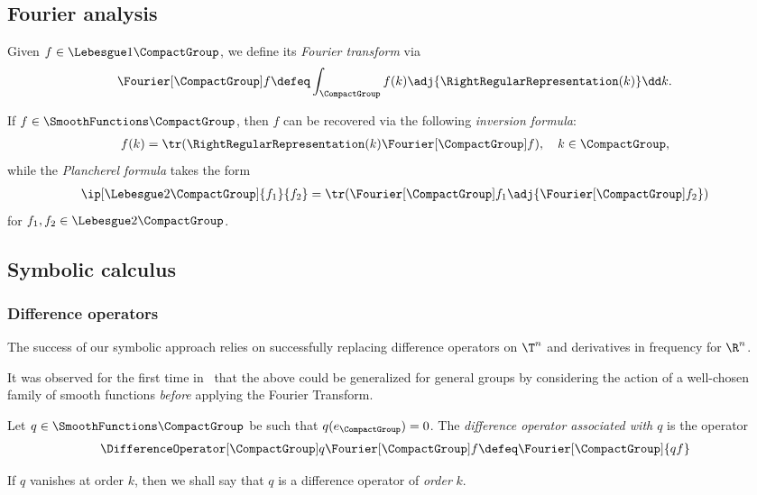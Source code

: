 \subsection{Fourier analysis}

Given $f \in \Lebesgue 1 \CompactGroup$,
we define its \emph{Fourier transform} via
\begin{align*}
    \Fourier [\CompactGroup] f \defeq \int_\CompactGroup f(k) \adj{\RightRegularRepresentation(k)} \dd k.
\end{align*}

If $f \in \SmoothFunctions \CompactGroup$,
then $f$ can be recovered via the following \emph{inversion formula}:
\begin{align*}
    f(k) = \tr(\RightRegularRepresentation(k) \Fourier [\CompactGroup] f),
    \quad k \in \CompactGroup,
\end{align*}
while the \emph{Plancherel formula} takes the form
\begin{align*}
    \ip [\Lebesgue 2 \CompactGroup] {f_1} {f_2}
    = \tr(\Fourier [\CompactGroup] f_1 \adj{\Fourier [\CompactGroup] f_2})
\end{align*}
for $f_1, f_2 \in \Lebesgue 2 \CompactGroup$.

\subsection{Symbolic calculus}

\subsubsection{Difference operators}

The success of our symbolic approach relies on successfully replacing difference operators on $\T^n$
and derivatives in frequency for $\R^n$.

It was observed for the first time in~\cite{RuzhanskyTurunen10}
that the above could be generalized for general groups by considering the action of a well-chosen family of smooth functions
\emph{before} applying the Fourier Transform.

\begin{definition}
    Let $q \in \SmoothFunctions \CompactGroup$ be such that $q(e_\CompactGroup) = 0$.
    The \emph{difference operator associated with $q$} is the operator
    \begin{align*}
        \DifferenceOperator [\CompactGroup] q \Fourier [\CompactGroup] f
        \defeq \Fourier [\CompactGroup] \{q f\}
    \end{align*}

    If $q$ vanishes at order $k$,
    then we shall say that $q$ is a difference operator of \emph{order} $k$.
\end{definition}

